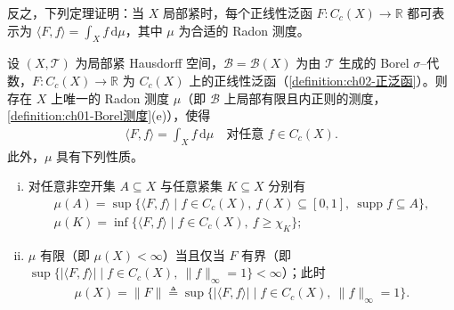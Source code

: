 \documentclass[../../main.tex]{subfiles}%
\begin{document}
反之，下列定理证明：当 $X$ 局部紧时，每个正线性泛函 $F:C_c(X)\to\mathbb R$ 都可表示为 $\langle F,f\rangle=\int_Xf\,\mathrm{d}\mu$，其中 $\mu$ 为合适的 Radon 测度。

\begin{theorem}[Riesz]\label{theorem:ch02-Riesz正泛函}
设 $(X,\mathscr T)$ 为局部紧 Hausdorff 空间，$\mathscr B=\mathscr B(X)$ 为由 $\mathscr T$ 生成的 Borel $\sigma$--代数，$F:C_c(X)\to\mathbb R$ 为 $C_c(X)$ 上的正线性泛函（\cref{definition:ch02-正泛函}）。则存在 $X$ 上唯一的 Radon 测度 $\mu$（即 $\mathscr B$ 上局部有限且内正则的测度，\cref{definition:ch01-Borel测度}(e)），使得
\begin{align}
\langle F,f\rangle=\int_Xf\,\mathrm{d}\mu\quad\text{对任意 }f\in C_c(X). \label{align:ch02-2.31}
\end{align}
此外，$\mu$ 具有下列性质。
\begin{enumerate}[(i)]
\item 对任意非空开集 $A\subseteq X$ 与任意紧集 $K\subseteq X$ 分别有
\begin{align}
\mu(A)=\sup\{\langle F,f\rangle\mid f\in C_c(X),\ f(X)\subseteq[0,1],\ \operatorname{supp}f\subseteq A\}, \label{align:ch02-2.32}\\
\mu(K)=\inf\{\langle F,f\rangle\mid f\in C_c(X),\ f\geqslant\chi_K\}; \label{align:ch02-2.33}
\end{align}
\item $\mu$ 有限（即 $\mu(X)<\infty$）当且仅当 $F$ 有界（即 $\sup\{\left|\langle F,f\rangle\right|\mid f\in C_c(X),\ \|f\|_\infty=1\}<\infty$）；此时
\begin{align*}
\mu(X)=\|F\|\triangleq\sup\{\left|\langle F,f\rangle\right|\mid f\in C_c(X),\ \|f\|_\infty=1\}.
\end{align*}
\end{enumerate}
\end{theorem}
\end{document}

